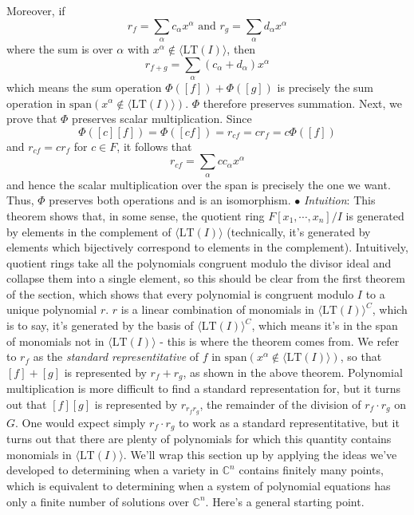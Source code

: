 \documentclass{article}
\newcommand*{\n}{\newline}
\newcommand*{\nn}{\newline \newline}
\newcommand*{\In}{\indent \ensuremath{\bullet} \textit{Intuition}: }
\newcommand*{\Fx}{\ensuremath{F[x_1, \cdots, x_n]}}
\begin{document}
Moreover, if
$$ r_f = \sum_\alpha c_\alpha x^\alpha \text{ and } r_g = \sum_\alpha d_\alpha x^\alpha $$
where the sum is over $ \alpha $ with $ x^\alpha \not \in \langle \text{LT}(I) \rangle $, then
$$ r_{f + g} = \sum_\alpha (c_\alpha + d_\alpha) x^\alpha $$
which means the sum operation $ \Phi([ f ]) + \Phi([ g ]) $ is precisely the sum operation in $ \text{span}(x^\alpha \not \in \langle \text{LT}(I) \rangle) $. $ \Phi $ therefore preserves summation.
\n
Next, we prove that $ \Phi $ preserves scalar multiplication. Since
$$ \Phi([ c ] [ f ]) = \Phi([ c f ]) = r_{c f} = c r_f = c \Phi([ f ]) $$
and $ r_{c f} = c r_f $ for $ c \in F $, it follows that
$$ r_{c f} = \sum_\alpha c c_\alpha x^\alpha $$
and hence the scalar multiplication over the span is precisely the one we want. Thus, $ \Phi $ preserves both operations and is an isomorphism. \qedsymbol
\n
\In This theorem shows that, in some sense, the quotient ring $ \Fx / I $ is generated by elements in the complement of $ \langle \text{LT}(I) \rangle $ (technically, it's generated by elements which bijectively correspond to elements in the complement). Intuitively, quotient rings take all the polynomials congruent modulo the divisor ideal and collapse them into a single element, so this should be clear from the first theorem of the section, which shows that every polynomial is congruent modulo $ I $ to a unique polynomial $ r $. $ r $ is a linear combination of monomials in $ \langle \text{LT}(I) \rangle^C $, which is to say, it's generated by the basis of $ \langle \text{LT}(I) \rangle^C $, which means it's in the span of monomials not in $ \langle \text{LT}(I) \rangle $ - this is where the theorem comes from.
\nn
We refer to $ r_f $ as the \textit{standard representitative} of $ f $ in $ \text{span}(x^\alpha \not \in \langle \text{LT}(I) \rangle) $, so that $ [ f ] + [ g ] $ is represented by $ r_f + r_g $, as shown in the above theorem. Polynomial multiplication is more difficult to find a standard representation for, but it turns out that $ [ f ] [ g ] $ is represented by $ r_{r_f r_g} $, the remainder of the division of $ r_f \cdot r_g $ on $ G $. One would expect simply $ r_f \cdot r_g $ to work as a standard representitative, but it turns out that there are plenty of polynomials for which this quantity contains monomials in $ \langle \text{LT}(I) \rangle $.
\n
We'll wrap this section up by applying the ideas we've developed to determining when a variety in $ \mathbb{C}^n $ contains finitely many points, which is equivalent to determining when a system of polynomial equations has only a finite number of solutions over $ \mathbb{C}^n $. Here's a general starting point.
\end{document}
